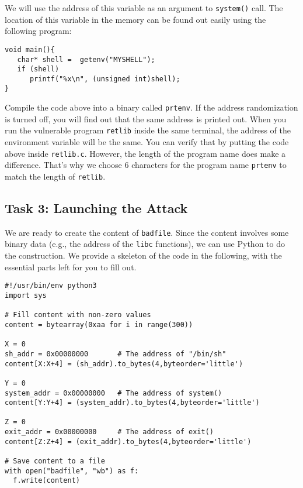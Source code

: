 We will use the address of this variable as an argument to {\tt system()} call.
The location of this variable in the memory can be found out easily using the 
following program: 

\begin{lstlisting}
void main(){
   char* shell =  getenv("MYSHELL");
   if (shell) 
      printf("%x\n", (unsigned int)shell);
}
\end{lstlisting}

Compile the code above into a binary called \texttt{prtenv}.  
If the address randomization is turned off, you will find out that the same 
address is printed out. When you run the vulnerable program \texttt{retlib}
inside the same terminal, the address of the environment
variable will be the same. You can verify that by putting 
the code above inside \texttt{retlib.c}. However, 
the length of the program name does make a difference. That's why
we choose 6 characters for the program name \texttt{prtenv} to match
the length of \texttt{retlib}.  



\subsection{Task 3: Launching the Attack}

We are ready to create the content of \texttt{badfile}. Since 
the content involves some binary data (e.g., the address of the 
\texttt{libc} functions), we can use Python to do the construction.  
We provide a skeleton of the code in the following, with the essential 
parts left for you to fill out.


\begin{lstlisting}
#!/usr/bin/env python3
import sys

# Fill content with non-zero values
content = bytearray(0xaa for i in range(300))

X = 0
sh_addr = 0x00000000       # The address of "/bin/sh"
content[X:X+4] = (sh_addr).to_bytes(4,byteorder='little')

Y = 0
system_addr = 0x00000000   # The address of system()
content[Y:Y+4] = (system_addr).to_bytes(4,byteorder='little')

Z = 0
exit_addr = 0x00000000     # The address of exit()
content[Z:Z+4] = (exit_addr).to_bytes(4,byteorder='little')

# Save content to a file
with open("badfile", "wb") as f:
  f.write(content)
\end{lstlisting}
 
